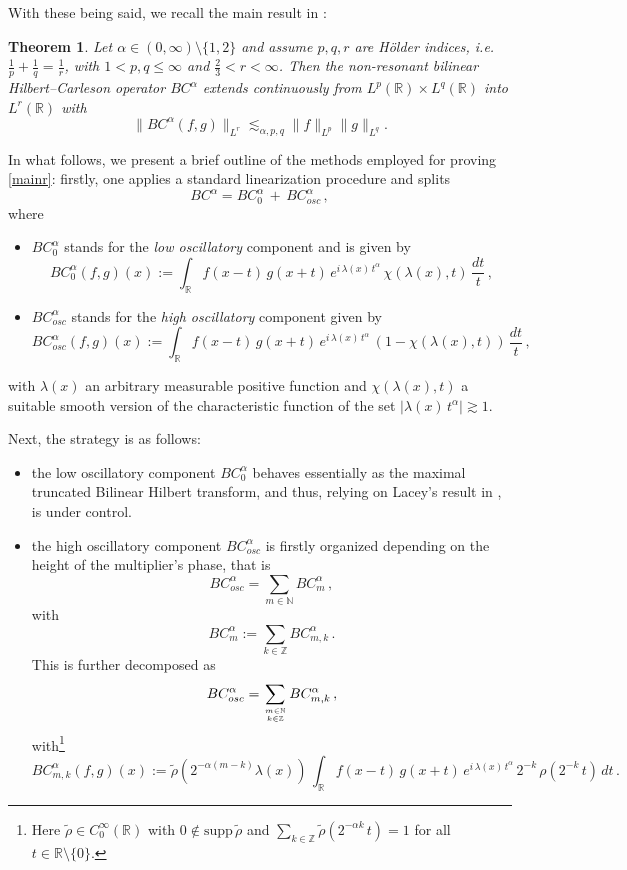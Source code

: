 \documentclass[a4paper,reqno]{amsart}
\numberwithin{equation}{section}
\newtheorem{theorem}{Theorem}[section]
\theoremstyle{definition}
\newcommand{\R}{\mathbb{R}}
\newcommand{\Z}{\mathbb{Z}}
\newcommand{\N}{\mathbb{N}}
\def\beq{\begin{equation}}
\def\eeq{\end{equation}}
\def\beq{\begin{equation}}
\def\eeq{\end{equation}}
\def\a{\alpha}
\def\l{\lambda}
\def\beq{\begin{equation}}
\def\eeq{\end{equation}}
\def\beq{\begin{equation}}
\def\eeq{\end{equation}}
\begin{document}
With these being said, we recall the main result in \cite{BBLV21}:

\begin{theorem} \label{main}  Let $\a\in(0, \infty)\setminus\{1, 2\}$ and assume $p, q, r$ are H\"older indices, \textit{i.e.} $\frac{1}{p}+\frac{1}{q}=\frac{1}{r}$, with $1<p, q \leq \infty$ and $\frac{2}{3}<r<\infty$. Then the non-resonant bilinear Hilbert--Carleson operator $BC^{\a}$ extends continuously from $L^p(\R)\times L^q(\R)$ into $L^r(\R)$ with
\beq\label{mainr}
\|BC^{\a}(f,g)\|_{L^r}\lesssim_{\a,p,q} \|f\|_{L^p} \|g\|_{L^q}.
\eeq
\end{theorem}

In what follows, we present a brief outline of the methods employed for proving \eqref{mainr}: firstly, one applies a standard linearization procedure and splits
\beq\label{bcdec}
BC^{\a}=BC^{\a}_0\,+\,BC^{\a}_{osc}\,,
\eeq
where
\begin{itemize}

\item $BC^{\a}_0$ stands for the \emph{low oscillatory} component and is given by
\beq\label{bc0}
BC^{\a}_0(f,g)(x):=\int_{\R}  f(x-t)\, g(x+t)\,e^{i\,\l(x)\,t^{\a}}\,\chi(\l(x),t)\,\frac{dt}{t} \,,
\eeq
\item $BC^{\a}_{osc}$ stands for the \emph{high oscillatory} component given by
\beq\label{bcosc}
BC^{\a}_{osc}(f,g)(x):=\int_{\R}  f(x-t)\, g(x+t)\,e^{i\,\l(x)\,t^{\a}}\,(1-\chi(\l(x),t))\,\frac{dt}{t} \,,
\eeq
\end{itemize}
with $\l(x)$ an arbitrary measurable positive function and $\chi(\l(x),t)$ a sui\-table smooth version of the characteristic function of the set $|\l(x)\,t^{\a}|\gtrsim 1$.


Next, the strategy is as follows:
\begin{itemize}
\item the low oscillatory component $BC^{\a}_0$ behaves essentially as the maximal truncated Bilinear Hilbert transform, and thus, relying on Lacey's result in \cite{Lac00}, is under control.

\item the high oscillatory component $BC^{\a}_{osc}$ is firstly organized depending on the height of the multiplier's phase, that is
\beq\label{bcoscdecm}
BC^{\a}_{osc}=\sum_{m\in\N} BC^{\a}_{m}\,,
\eeq
with
\beq\label{bcoscdecmdef}
BC^{\a}_{m}:=\sum_{k\in\Z} BC^{\a}_{m,k}\,.
\eeq
This is further decomposed as
\beq\label{bcoscdec}
BC^{\a}_{osc}=\sum_{{m\in\N}\atop{k\in\Z}} BC^{\a}_{m,k}\,,
\eeq
with\footnote{Here $\tilde{\rho}\in C_0^{\infty}(\R)$ with $0\notin\textrm{supp}\,\tilde{\rho}$ and
$\sum_{k\in\Z} \tilde{\rho}(2^{-\a k}\,t)=1$ for all $t\in \R\setminus\{0\}$.}
\beq\label{bcoscdecmk}
 BC^{\a}_{m,k}(f,g)(x):=\tilde{\rho}(2^{-\a(m-k)}\l(x))\,\int_{\R}  f(x-t)\, g(x+t)\,e^{i\,\l(x)\,t^{\a}}\,2^{-k}\,\rho(2^{-k}\,t)\,dt\,.
\eeq
\end{itemize}
\end{document}
